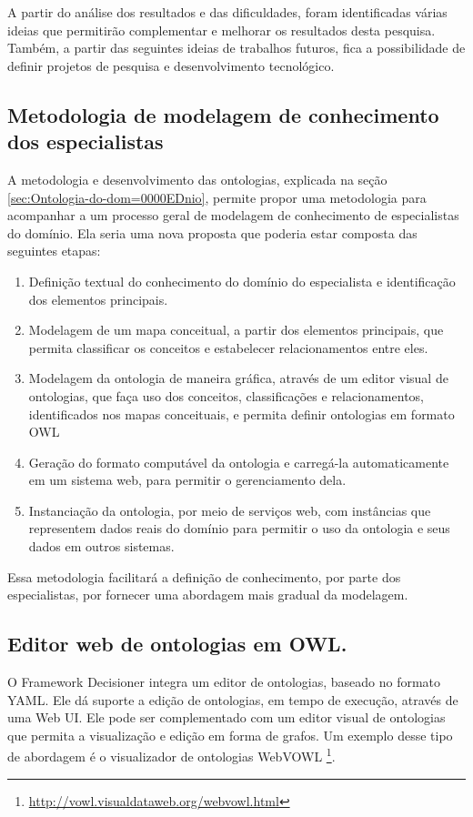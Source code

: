 A partir do análise dos resultados e das dificuldades, foram identificadas
várias ideias que permitirão complementar e melhorar os resultados
desta pesquisa. Também, a partir das seguintes ideias de trabalhos
futuros, fica a possibilidade de definir projetos de pesquisa e desenvolvimento
tecnológico.

\subsection*{Metodologia de modelagem de conhecimento dos especialistas}

A metodologia e desenvolvimento das ontologias, explicada na seção
\ref{sec:Ontologia-do-dom=0000EDnio}, permite propor uma metodologia
para acompanhar a um processo geral de modelagem de conhecimento de
especialistas do domínio. Ela seria uma nova proposta que poderia
estar composta das seguintes etapas:
\begin{enumerate}
\item Definição textual do conhecimento do domínio do especialista e identificação
dos elementos principais.
\item Modelagem de um mapa conceitual, a partir dos elementos principais,
que permita classificar os conceitos e estabelecer relacionamentos
entre eles.
\item Modelagem da ontologia de maneira gráfica, através de um editor visual
de ontologias, que faça uso dos conceitos, classificações e relacionamentos,
identificados nos mapas conceituais, e permita definir ontologias
em formato \foreignlanguage{english}{OWL}
\item Geração do formato computável da ontologia e carregá-la automaticamente
em um sistema web, para permitir o gerenciamento dela.
\item Instanciação da ontologia, por meio de serviços \foreignlanguage{english}{web,}
com instâncias que representem dados reais do domínio para permitir
o uso da ontologia e seus dados em outros sistemas.
\end{enumerate}
Essa metodologia facilitará a definição de conhecimento, por parte
dos especialistas, por fornecer uma abordagem mais gradual da modelagem.

\subsection*{Editor web de ontologias em OWL.}

O Framework Decisioner integra um editor de ontologias, baseado no
formato \foreignlanguage{english}{YAML}. Ele dá suporte a edição de
ontologias, em tempo de execução, através de uma Web UI. Ele pode
ser complementado com um editor visual de ontologias que permita a
visualização e edição em forma de grafos. Um exemplo desse tipo de
abordagem é o visualizador de ontologias WebVOWL \footnote{\url{http://vowl.visualdataweb.org/webvowl.html}}. 

